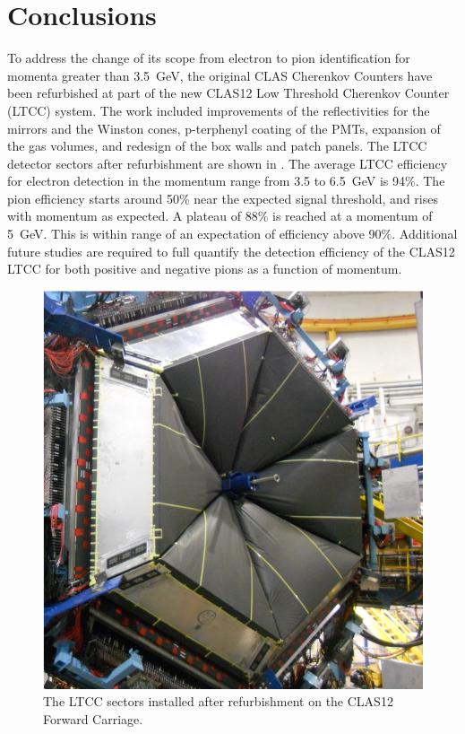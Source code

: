 \section{Conclusions}

To address the change of its scope from electron to pion identification for momenta greater than 3.5~GeV,
the original CLAS Cherenkov Counters have been refurbished at part of the new CLAS12 Low Threshold
Cherenkov Counter (LTCC) system. The work included improvements of the reflectivities for the mirrors and
the Winston cones, p-terphenyl coating of the PMTs, expansion of the gas volumes, and redesign of the box
walls and patch panels. The LTCC detector sectors after refurbishment are shown in .
The average LTCC efficiency for electron detection in the momentum range from 3.5 to 6.5~GeV is 94$\%$.
The pion efficiency starts around 50$\%$ near the expected signal threshold, and rises with momentum as
expected. A plateau of 88$\%$ is reached at a momentum of 5~GeV. This is within range of an expectation of
efficiency above 90$\%$. Additional future studies are required to full quantify the
detection efficiency of the CLAS12 LTCC for both positive and negative pions as a function of momentum.


\begin{figure}
    \centering
    \includegraphics[width=1.0\columnwidth,keepaspectratio]{img/ltccInstalled.png}
    \caption{The LTCC sectors installed after refurbishment on the CLAS12 Forward Carriage.}
    \label{fig:ltccInstalled}
\end{figure}

